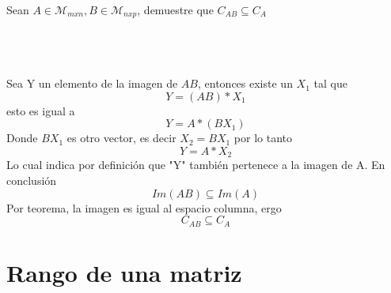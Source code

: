 \begin{ejercicio}
Sean $A\in \mathcal{M}_{mxn}, B \in \mathcal{M}_{nxp}$, demuestre que $C_{AB}\subseteq C_A$


~\\

\sol
~\\
~\\
Sea Y un elemento de la imagen de $AB$, entonces existe un $X_1$ tal que 
$$Y=(AB)*X_1$$
esto es igual a 
$$Y=A*(BX_1)$$
Donde $BX_1$ es otro vector, es decir $X_2=BX_1$
por lo tanto
$$Y=A*X_2$$
Lo cual indica por definición que "Y" también pertenece a la imagen de A.
En conclusión $$Im(AB) \subseteq Im(A)$$
Por teorema, la imagen es igual al espacio columna, ergo
$$C_{AB} \subseteq C_A$$

\end{ejercicio}

\section{Rango de una matriz}

\newpage
